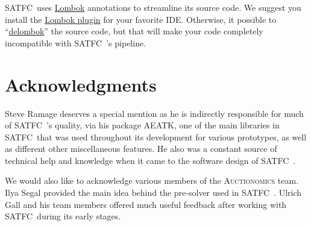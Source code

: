 \documentclass[
10pt, %
letterpaper, %
oneside, %
headinclude,footinclude, %
BCOR5mm, %
needspace, %
]{scrartcl}
\newcommand{\SATFC}{\textsc{SATFC}~}
\newcommand{\AEATK}{\textsc{AEATK}}
\begin{document}
\SATFC uses \href{http://projectlombok.org/}{Lombok} annotations to streamline its source code. We suggest you install the \href{http://projectlombok.org/download.html}{Lombok plugin} for your favorite IDE. Otherwise, it possible to ``\href{http://projectlombok.org/features/delombok.html}{delombok}'' the source code, but that will make your code completely incompatible with \SATFC's pipeline.

\section{Acknowledgments}

Steve Ramage deserves a special mention as he is indirectly responsible for much of \SATFC's quality, via his package \AEATK, one of the main libraries in \SATFC that was used throughout its development for various prototypes, as well as different other miscellaneous features. He also was a constant source of technical help and knowledge when it came to the software design of \SATFC.

We would also like to acknowledge various members of the \textsc{Auctionomics} team. Ilya Segal provided the main idea behind the pre-solver used in \SATFC. Ulrich Gall and his team members offered much useful feedback after working with \SATFC during its early stages.
\end{document}
